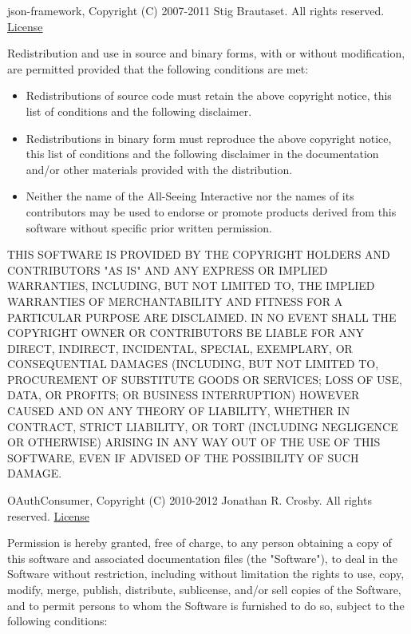 \documentclass{tufte-book}
\newcommand{\licensetext}{\scriptsize \setlength{\parskip}{0mm} \singlespacing}
\begin{document}
\begin{fullwidth}
json-framework, Copyright (C) 2007-2011 Stig Brautaset. All rights reserved. \href{https://raw.github.com/stig/json-framework/master/LICENSE.md}{License}

{\licensetext Redistribution and use in source and binary forms, with or without
modification, are permitted provided that the following conditions are met:

\begin{itemize}

\item Redistributions of source code must retain the above copyright
notice, this list of conditions and the following disclaimer.
       
       
\item Redistributions in binary form must reproduce the above copyright
notice, this list of conditions and the following disclaimer in the
documentation and/or other materials provided with the distribution.

\item Neither the name of the All-Seeing Interactive nor the
names of its contributors may be used to endorse or promote products
derived from this software without specific prior written permission.
\end{itemize}

THIS SOFTWARE IS PROVIDED BY THE COPYRIGHT HOLDERS AND CONTRIBUTORS "AS IS"
AND ANY EXPRESS OR IMPLIED WARRANTIES, INCLUDING, BUT NOT LIMITED TO, THE
IMPLIED WARRANTIES OF MERCHANTABILITY AND FITNESS FOR A PARTICULAR PURPOSE ARE
DISCLAIMED. IN NO EVENT SHALL THE COPYRIGHT OWNER OR CONTRIBUTORS BE LIABLE
FOR ANY DIRECT, INDIRECT, INCIDENTAL, SPECIAL, EXEMPLARY, OR CONSEQUENTIAL
DAMAGES (INCLUDING, BUT NOT LIMITED TO, PROCUREMENT OF SUBSTITUTE GOODS OR
SERVICES; LOSS OF USE, DATA, OR PROFITS; OR BUSINESS INTERRUPTION) HOWEVER
CAUSED AND ON ANY THEORY OF LIABILITY, WHETHER IN CONTRACT, STRICT LIABILITY,
OR TORT (INCLUDING NEGLIGENCE OR OTHERWISE) ARISING IN ANY WAY OUT OF THE USE
OF THIS SOFTWARE, EVEN IF ADVISED OF THE POSSIBILITY OF SUCH DAMAGE.}

OAuthConsumer, Copyright (C) 2010-2012 Jonathan R. Crosby. All rights reserved. \href{http://www.opensource.org/licenses/mit-license.php}{License}

{\licensetext Permission is hereby granted, free of charge, to any person obtaining a copy of this software and associated documentation files (the "Software"), to deal in the Software without restriction, including without limitation the rights to use, copy, modify, merge, publish, distribute, sublicense, and/or sell copies of the Software, and to permit persons to whom the Software is furnished to do so, subject to the following conditions:

}
\end{fullwidth}
\end{document}
